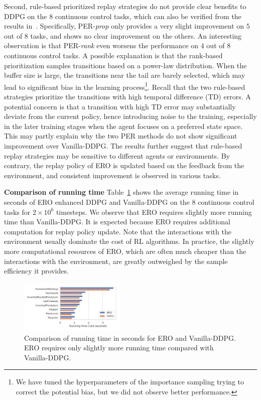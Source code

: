 \documentclass{article}
\newcommand{\paratitle}[1]{\vspace{1.5ex}\noindent \textbf{#1\quad}}
\begin{document}
Second, rule-based prioritized replay strategies do not provide clear benefits to DDPG on the $8$ continuous control tasks, which can also be verified from the results in~\cite{novati2018remember}. Specifically, PER-\emph{prop} only provides a very slight improvement on $5$ out of $8$ tasks, and shows no clear improvement on the others. An interesting observation is that PER-\emph{rank} even worsens the performance on $4$ out of $8$ continuous control tasks. A possible explanation is that the rank-based prioritization samples transitions based on a power-law distribution. When the buffer size is large, the transitions near the tail are barely selected, which may lead to significant bias in the learning process\footnote{We have tuned the hyperparameters of the importance sampling trying to correct the potential bias, but we did not observe better performance.}. Recall that the two rule-based strategies prioritize the transitions with high temporal difference (TD) errors. A potential concern is that a transition with high TD error may substantially deviate from the current policy, hence introducing noise to the training, especially in the later training stages when the agent focuses on a preferred state space. This may partly explain why the two PER methods do not show significant improvement over Vanilla-DDPG. The results further suggest that rule-based replay strategies may be sensitive to different agents or environments. By contrary, the replay policy of ERO is updated based on the feedback from the environment, and consistent improvement is observed in various tasks.



\paratitle{Comparison of running time} Table~\ref{label:time} shows the average running time in seconds of ERO enhanced DDPG and Vanilla-DDPG on the 8 continuous control tasks for $2 \times 10^6$ timesteps. We observe that ERO requires slightly more running time than Vanilla-DDPG. It is expected because ERO requires additional computation for replay policy update. Note that the interactions with the environment usually dominate the cost of RL algorithms. In practice, the slightly more computational resources of ERO, which are often much cheaper than the interactions with the environment, are greatly outweighed by the sample efficiency it provides.

\begin{figure}[t]
  \centering
  \includegraphics[width=0.45\textwidth]{time.pdf}
  \caption{Comparison of running time in seconds for ERO and Vanilla-DDPG. ERO requires only slightly more running time compared with Vanilla-DDPG.}
  \label{label:time}
\end{figure}
\end{document}
